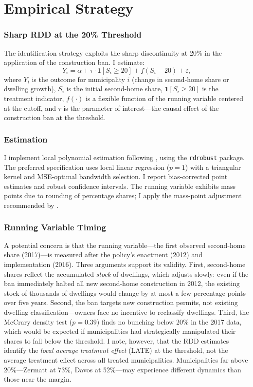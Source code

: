\documentclass[12pt]{article}
\begin{document}


\section{Empirical Strategy}
\label{sec:strategy}

\subsubsection*{Sharp RDD at the 20\% Threshold} The identification strategy exploits the sharp discontinuity at 20\% in the application of the construction ban. I estimate:
\begin{equation}
Y_i = \alpha + \tau \cdot \mathbf{1}[S_i \geq 20] + f(S_i - 20) + \varepsilon_i
\label{eq:rdd}
\end{equation}
where $Y_i$ is the outcome for municipality $i$ (change in second-home share or dwelling growth), $S_i$ is the initial second-home share, $\mathbf{1}[S_i \geq 20]$ is the treatment indicator, $f(\cdot)$ is a flexible function of the running variable centered at the cutoff, and $\tau$ is the parameter of interest---the causal effect of the construction ban at the threshold.

\subsubsection*{Estimation} I implement local polynomial estimation following \citet{calonico2014}, using the \texttt{rdrobust} package. The preferred specification uses local linear regression ($p=1$) with a triangular kernel and MSE-optimal bandwidth selection. I report bias-corrected point estimates and robust confidence intervals. The running variable exhibits mass points due to rounding of percentage shares; I apply the mass-point adjustment recommended by \citet{cattaneo2019rdt}.

\subsubsection*{Running Variable Timing} A potential concern is that the running variable---the first observed second-home share (2017)---is measured after the policy's enactment (2012) and implementation (2016). Three arguments support its validity. First, second-home shares reflect the accumulated \textit{stock} of dwellings, which adjusts slowly: even if the ban immediately halted all new second-home construction in 2012, the existing stock of thousands of dwellings would change by at most a few percentage points over five years. Second, the ban targets new construction permits, not existing dwelling classification---owners face no incentive to reclassify dwellings. Third, the McCrary density test ($p = 0.39$) finds no bunching below 20\% in the 2017 data, which would be expected if municipalities had strategically manipulated their shares to fall below the threshold. I note, however, that the RDD estimates identify the \textit{local average treatment effect} (LATE) at the threshold, not the average treatment effect across all treated municipalities. Municipalities far above 20\%---Zermatt at 73\%, Davos at 52\%---may experience different dynamics than those near the margin.
\end{document}
